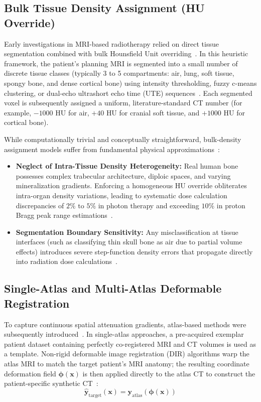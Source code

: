 \subsection{Bulk Tissue Density Assignment (HU Override)}
Early investigations in MRI-based radiotherapy relied on direct tissue segmentation combined with bulk Hounsfield Unit overriding~\cite{kapanen2013t1,edmund2017review}. In this heuristic framework, the patient's planning MRI is segmented into a small number of discrete tissue classes (typically 3 to 5 compartments: air, lung, soft tissue, spongy bone, and dense cortical bone) using intensity thresholding, fuzzy c-means clustering, or dual-echo ultrashort echo time (UTE) sequences~\cite{kapanen2013t1,korhonen2014evaluation}. Each segmented voxel is subsequently assigned a uniform, literature-standard CT number (for example, $-1000\text{ HU}$ for air, $+40\text{ HU}$ for cranial soft tissue, and $+1000\text{ HU}$ for cortical bone).

While computationally trivial and conceptually straightforward, bulk-density assignment models suffer from fundamental physical approximations~\cite{edmund2017review}:
\begin{itemize}
    \item \textbf{Neglect of Intra-Tissue Density Heterogeneity:} Real human bone possesses complex trabecular architecture, diploic spaces, and varying mineralization gradients. Enforcing a homogeneous HU override obliterates intra-organ density variations, leading to systematic dose calculation discrepancies of $2\%\text{ to }5\%$ in photon therapy and exceeding $10\%$ in proton Bragg peak range estimations~\cite{edmund2017review,siversson2015mri}.
    \item \textbf{Segmentation Boundary Sensitivity:} Any misclassification at tissue interfaces (such as classifying thin skull bone as air due to partial volume effects) introduces severe step-function density errors that propagate directly into radiation dose calculations~\cite{korsholm2018clinical}.
\end{itemize}

\subsection{Single-Atlas and Multi-Atlas Deformable Registration}
To capture continuous spatial attenuation gradients, atlas-based methods were subsequently introduced~\cite{sjolund2015comprehensive,gudur2014mri,burgos2014multi,dowling2015automatic}. In single-atlas approaches, a pre-acquired exemplar patient dataset containing perfectly co-registered MRI and CT volumes is used as a template. Non-rigid deformable image registration (DIR) algorithms warp the atlas MRI to match the target patient's MRI anatomy; the resulting coordinate deformation field $\boldsymbol{\phi}(\mathbf{x})$ is then applied directly to the atlas CT to construct the patient-specific synthetic CT~\cite{sjolund2015comprehensive}:
\begin{equation}
\mathbf{\hat{y}}_{\text{target}}(\mathbf{x}) = \mathbf{y}_{\text{atlas}}(\boldsymbol{\phi}(\mathbf{x}))
\label{eq:atlas_dir}
\end{equation}

